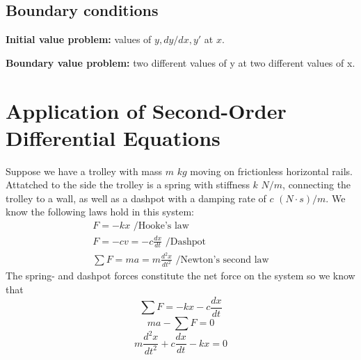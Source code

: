 \documentclass[12pt]{article}
\begin{document}
\subsection*{Boundary conditions}
\textbf{Initial value problem:} values of \(y,dy/dx,y'\) at \(x\). 

\noindent 
\textbf{Boundary value problem:} two different values of y at two different values 
of x.

\section*{Application of Second-Order Differential Equations}
Suppose we have a trolley with mass \(m\) \(kg\) moving on frictionless horizontal rails. 
Attatched to the side the trolley is a spring with stiffness \(k\) \(N/m\), connecting the trolley to a wall, 
as well as a dashpot with a damping rate of \(c\) \((N\cdot s)/m\). 
We know the following laws hold in this system: 
\begin{gather*}
    F = -kx \text{ /Hooke's law} \\ 
    F = -cv = -c\frac{dx}{dt} \text{ /Dashpot} \\ 
    \displaystyle\sum F = ma = m\frac{d^2x}{dt^2} \text{ /Newton's second law}
\end{gather*}
The spring- and dashpot forces constitute the net force on the system so we know 
that 
\[ 
    \displaystyle\sum F = -kx - c\frac{dx}{dt}
\]
\[ 
    ma - \displaystyle\sum F = 0 
\]
\[ 
    m\frac{d^2x}{dt^2} + c\frac{dx}{dt} - kx = 0
\] 
\end{document}
